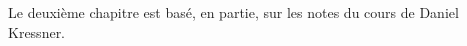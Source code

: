 \documentclass[a4paper,11pt,french]{scrbook}
\theoremstyle{plain}
\theoremstyle{definition}
\begin{document}
Le deuxième   chapitre est basé, en partie, sur les notes du cours de Daniel Kressner.  

\tableofcontents  


 








\end{document}
